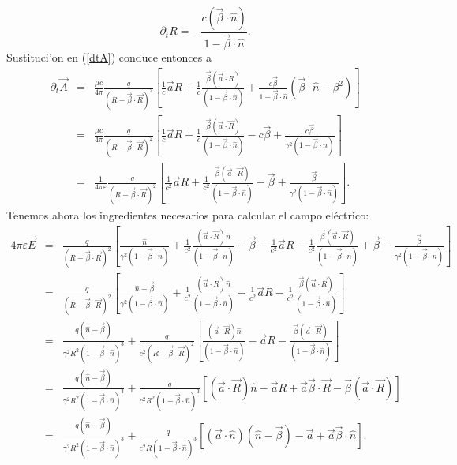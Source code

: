 \begin{equation}
\boxed{\partial_t R=-\frac{c(\vec\beta\cdot\hat{n})}{1-\vec{\beta}\cdot\hat{n}}.}
\end{equation}
Sustituci'on en (\ref{dtA}) conduce entonces a
\begin{eqnarray}
 \partial_t \vec{A}
&=&\frac{\mu c}{4\pi}\frac{q}{(R-\vec{\beta}\cdot\vec{R})^2}\left[\frac{1}{c}\vec{a}R+\frac{1}{c}
\frac{\vec{\beta}(\vec{a}\cdot\vec{R})}{(1-\vec{\beta}\cdot\hat{n})}+\frac{c\vec\beta}{1-\vec{\beta}\cdot\hat{n}}(\vec{\beta}\cdot\hat{n}-\beta^2)\right] \\
&=&\frac{\mu c}{4\pi}\frac{q}{(R-\vec{\beta}\cdot\vec{R})^2}\left[\frac{1}{c}\vec{a}R+\frac{1}{c}
\frac{\vec{\beta}(\vec{a}\cdot\vec{R})}{(1-\vec{\beta}\cdot\hat{n})}-c\vec\beta+\frac{c\vec\beta}{\gamma^2(1-\vec{\beta}\cdot\hat{n})}\right] \\
&=&\frac{1}{4\pi\varepsilon}\frac{q}{(R-\vec{\beta}\cdot\vec{R})^2}\left[\frac{1}{c^2}\vec{a}R+\frac{1}{c^2}\frac{\vec{\beta}(\vec{a}\cdot\vec{R})}{(1-\vec{\beta}\cdot\hat{n})}-\vec\beta+\frac{\vec\beta}{\gamma^2(1-\vec{\beta}\cdot\hat{n})}\right] .
\end{eqnarray}
Tenemos ahora los ingredientes necesarios para calcular el campo eléctrico:
\begin{eqnarray}
4\pi\varepsilon\vec{E}&=&\frac{q}{(R-\vec{\beta}\cdot\vec{R})^2}\left[\frac{\hat{n}}{\gamma^2(1-\vec{\beta}\cdot\hat{n})}+\frac{1}{c^2}\frac{(\vec{a}\cdot\vec{R})\hat{n}}{(1-\vec{\beta}\cdot\hat{n})}-\vec\beta-\frac{1}{c^2}\vec{a}R-\frac{1}{c^2}\frac{\vec{\beta}(\vec{a}\cdot\vec{R})}{(1-\vec{\beta}\cdot\hat{n})}+\vec\beta-\frac{\vec\beta}{\gamma^2(1-\vec{\beta}\cdot\hat{n})}\right] \nonumber \\
&=&\frac{q}{(R-\vec{\beta}\cdot\vec{R})^2}\left[\frac{\hat{n}-\vec\beta}{\gamma^2(1-\vec{\beta}\cdot\hat{n})}+\frac{1}{c^2}\frac{(\vec{a}\cdot\vec{R})\hat{n}}{(1-\vec{\beta}\cdot\hat{n})}-\frac{1}{c^2}\vec{a}R-\frac{1}{c^2}\frac{\vec{\beta}(\vec{a}\cdot\vec{R})}{(1-\vec{\beta}\cdot\hat{n})}\right] \\
&=&\frac{q(\hat{n}-\vec\beta)}{\gamma^2R^2(1-\vec{\beta}\cdot\hat{n})^3}+\frac{q}{c^2(R-\vec{\beta}\cdot\vec{R})^2}\left[\frac{(\vec{a}\cdot\vec{R})\hat{n}}{(1-\vec{\beta}\cdot\hat{n})}-\vec{a}R-\frac{\vec{\beta}(\vec{a}\cdot\vec{R})}{(1-\vec{\beta}\cdot\hat{n})}\right] \\
&=&\frac{q(\hat{n}-\vec\beta)}{\gamma^2R^2(1-\vec{\beta}\cdot\hat{n})^3}+\frac{q}{c^2R^2(1-\vec{\beta}\cdot\hat{n})^3}\left[(\vec{a}\cdot\vec{R})\hat{n}-\vec{a}R+\vec{a}\vec{\beta}\cdot\vec{R}-\vec{\beta}(\vec{a}\cdot\vec{R})\right] \\
&=&\frac{q(\hat{n}-\vec\beta)}{\gamma^2R^2(1-\vec{\beta}\cdot\hat{n})^3}+\frac{q}{c^2R(1-\vec{\beta}\cdot\hat{n})^3}\left[(\vec{a}\cdot\hat{n})(\hat{n}-\vec{\beta})-\vec{a}+\vec{a}\vec{\beta}\cdot\hat{n}\right] .
\end{eqnarray}
